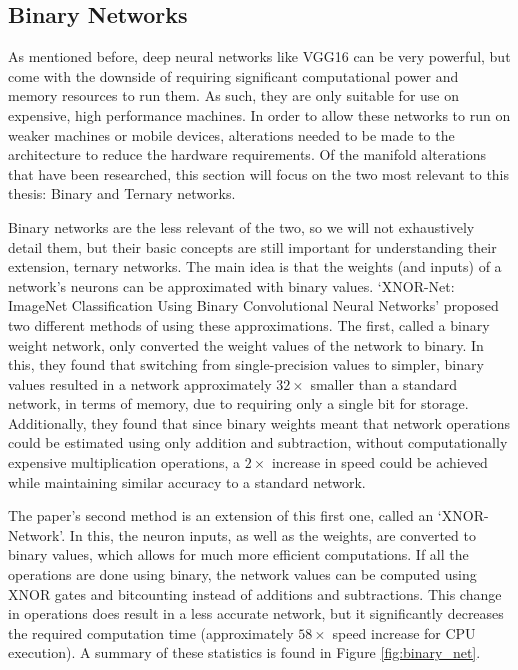 \documentclass[11pt,a4paper,oldfontcommands]{memoir}
\begin{document}
\subsection{Binary Networks}
\label{ss:binary}
As mentioned before, deep neural networks like VGG16 can be very powerful, but come with the downside of requiring significant computational power and memory resources to run them. As such, they are only suitable for use on expensive, high performance machines. In order to allow these networks to run on weaker machines or mobile devices, alterations needed to be made to the architecture to reduce the hardware requirements. Of the manifold alterations that have been researched, this section will focus on the two most relevant to this thesis: Binary \cite{binary} and Ternary \cite{ternary} networks.

Binary networks are the less relevant of the two, so we will not exhaustively detail them, but their basic concepts are still important for understanding their extension, ternary networks. The main idea is that the weights (and inputs) of a network's neurons can be approximated with binary values. `XNOR-Net: ImageNet Classification Using Binary Convolutional Neural Networks' \cite{binary} proposed two different methods of using these approximations. The first, called a binary weight network, only converted the weight values of the network to binary. In this, they found that switching from single-precision values to simpler, binary values resulted in a network approximately $32\times$ smaller than a standard network, in terms of memory, due to requiring only a single bit for storage. Additionally, they found that since binary weights meant that network operations could be estimated using only addition and subtraction, without computationally expensive multiplication operations, a $2\times$ increase in speed could be achieved while maintaining similar accuracy to a standard network. 

The paper's second method is an extension of this first one, called an `XNOR-Network'. In this, the neuron inputs, as well as the weights, are converted to binary values, which allows for much more efficient computations. If all the operations are done using binary, the network values can be computed using XNOR gates and bitcounting instead of additions and subtractions. This change in operations does result in a less accurate network, but it significantly decreases the required computation time (approximately $58\times$ speed increase for CPU execution). A summary of these statistics is found in Figure \ref{fig:binary_net}.
\end{document}
